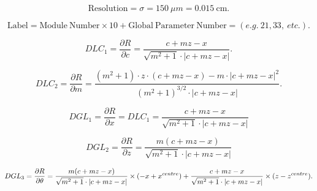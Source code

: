 \documentclass[a4paper,11pt]{article}
\begin{document}
\begin{equation}	
\mathrm{Resolution} = \sigma = 150 \ \mu m = 0.015 \ \mathrm{cm}.
\end{equation}

\begin{equation}	
\mathrm{Label}= \mathrm{Module \ Number} \times 10 + \mathrm{Global \ Parameter \ Number} = (e.g. \ 21, 33, \ etc.).
\end{equation}

\begin{equation}
DLC_1 = \frac{\partial R}{\partial c} = \frac{ c+mz-x }  { \sqrt{m^2+1} \cdot |c+mz-x| }.
\end{equation}

\begin{equation}
DLC_2 = \frac{ \partial R}{\partial m} = \frac{ (m^2+1)\cdot z\cdot(c+mz-x) - m\cdot |c+mz-x|^2 }{ (m^2+1)^{3/2} \cdot |c+mz-x|  }.
\end{equation}

\begin{equation}	
DGL_1 = \frac{\partial R}{\partial x} = DLC_1 = \frac{ c+mz-x }  { \sqrt{m^2+1} \cdot |c+mz-x| }
\end{equation}

\begin{equation}	
DGL_2 = \frac{\partial R}{\partial z} = \frac{ m(c+mz-x) }  { \sqrt{m^2+1} \cdot |c+mz-x| }
\end{equation}

\begin{equation}	
DGL_3 = \frac{\partial R}{\partial\theta} = 
\frac{ m(c+mz-x) }  { \sqrt{m^2+1} \cdot |c+mz-x| } \times (-x + x^{centre}) + \\ \frac{ c+mz-x }  { \sqrt{m^2+1} \cdot |c+mz-x| } \times (z - z^{centre}).
\end{equation}

\clearpage


\nocite{*}
\thispagestyle{plain}

\end{document}
